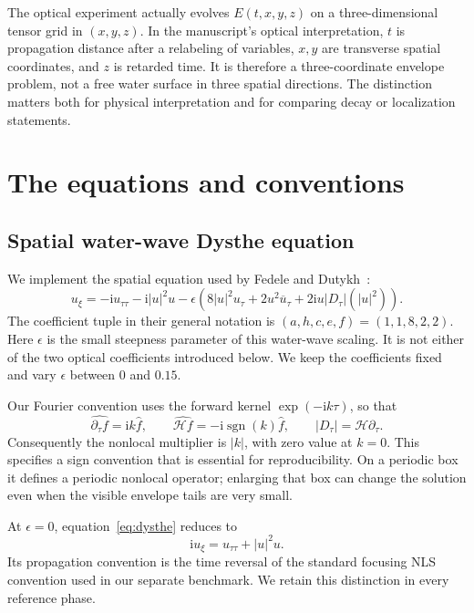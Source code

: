 \documentclass[10pt,letterpaper]{article}
\numberwithin{equation}{section}
\newcommand{\ii}{\mathrm{i}}
\begin{document}
The optical experiment actually evolves $E(t,x,y,z)$ on a three-dimensional tensor grid in $(x,y,z)$. In the manuscript's optical interpretation, $t$ is propagation distance after a relabeling of variables, $x,y$ are transverse spatial coordinates, and $z$ is retarded time. It is therefore a three-coordinate envelope problem, not a free water surface in three spatial directions. The distinction matters both for physical interpretation and for comparing decay or localization statements.

\section{The equations and conventions}
\subsection{Spatial water-wave Dysthe equation}
We implement the spatial equation used by Fedele and Dutykh~\cite{FD}:
\begin{equation}\label{eq:dysthe}
 u_\xi=-\ii u_{\tau\tau}-\ii |u|^2u
 -\epsilon\left(8|u|^2u_\tau+2u^2\overline{u}_\tau
       +2\ii u|D_\tau|(|u|^2)\right).
\end{equation}
The coefficient tuple in their general notation is $(a,h,c,e,f)=(1,1,8,2,2)$. Here $\epsilon$ is the small steepness parameter of this water-wave scaling. It is not either of the two optical coefficients introduced below. We keep the coefficients fixed and vary $\epsilon$ between $0$ and $0.15$.

Our Fourier convention uses the forward kernel $\exp(-\ii k\tau)$, so that
\begin{equation}
 \widehat{\partial_\tau f}=\ii k\widehat f,\qquad
 \widehat{\mathcal Hf}=-\ii\operatorname{sgn}(k)\widehat f,
 \qquad |D_\tau|=\mathcal H\partial_\tau.
\end{equation}
Consequently the nonlocal multiplier is $|k|$, with zero value at $k=0$. This specifies a sign convention that is essential for reproducibility. On a periodic box it defines a periodic nonlocal operator; enlarging that box can change the solution even when the visible envelope tails are very small.

At $\epsilon=0$, equation~\eqref{eq:dysthe} reduces to
\begin{equation}\label{eq:spatialnls}
 \ii u_\xi=u_{\tau\tau}+|u|^2u.
\end{equation}
Its propagation convention is the time reversal of the standard focusing NLS convention used in our separate benchmark. We retain this distinction in every reference phase.
\end{document}
